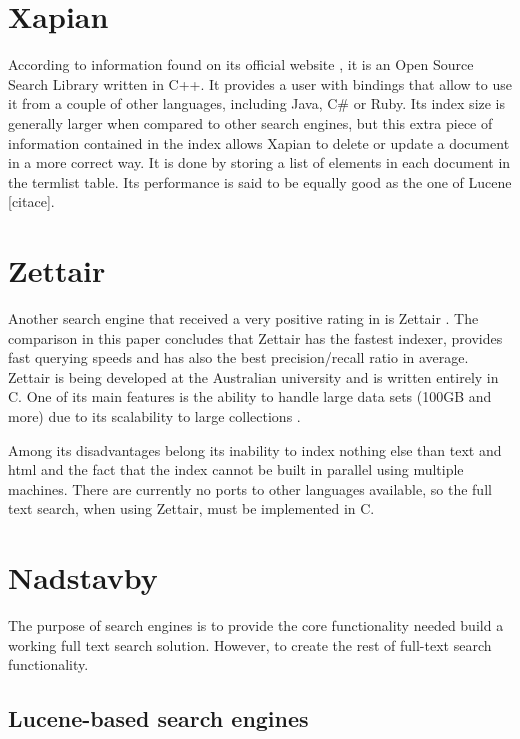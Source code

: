 \section{Xapian}

According to information found on its official website \cite{XapianHome},
it is an Open Source Search Library written in C++. 
It provides a user with bindings that allow to use it from a couple of other languages,
including Java, C\# or Ruby. 
Its index size is generally larger when compared to other search engines, but this extra piece of information contained in the index allows Xapian to delete or update a document in a more correct way. 
It is done by storing a list of elements in each document in the termlist table\cite{XapianIndexSize}. 
Its performance is said to be equally good as the one of Lucene {[}citace{]}.


\section{Zettair}

Another search engine that received a very positive rating in \cite{MiddletonBaeza} is Zettair \cite{ZettairHome}. 
The comparison in this paper concludes that Zettair has the fastest indexer, provides fast querying speeds and has also the best precision/recall ratio in average. 
Zettair is being developed at the Australian university and is written entirely
in C. 
One of its main features is the ability to handle large data
sets (100GB and more) due to its scalability to large collections \cite{ZettairHome}.

Among its disadvantages belong its inability to index nothing else than text and html and the fact that the index cannot be built in
parallel using multiple machines. 
There are currently no ports to other languages available, so the full text search, when using Zettair, must be implemented in C.


\section{Nadstavby}


The purpose of search engines is to provide the core functionality needed build a working full text search solution.
However, to create the rest of full-text search functionality.


\subsection{Lucene-based search engines}

